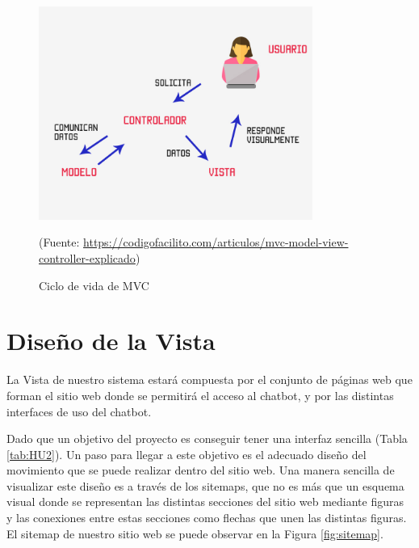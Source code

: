 \begin{figure}[h]
\centering
\includegraphics[width=0.8\textwidth]{imagenes/06_Diseno/ciclo_vida_MVC.jpg}
\begin{center}
(Fuente: \url{https://codigofacilito.com/articulos/mvc-model-view-controller-explicado})
\end{center}
\caption{Ciclo de vida de MVC}
\label{fig:ciclo_vida_MVC}
\end{figure}

\section{Diseño de la Vista} \label{sec:diseño_vista}

La Vista de nuestro sistema estará compuesta por el conjunto de páginas web que forman el sitio web donde se permitirá el acceso al chatbot, y por las distintas interfaces de uso del chatbot.

Dado que un objetivo del proyecto es conseguir tener una interfaz sencilla (Tabla \ref{tab:HU2}). Un paso para llegar a este objetivo es el adecuado diseño del movimiento que se puede realizar dentro del sitio web. Una manera sencilla de visualizar este diseño es a través de los sitemaps, que no es más que un esquema visual donde se representan las distintas secciones del sitio web mediante figuras y las conexiones entre estas secciones como flechas que unen las distintas figuras. El sitemap de nuestro sitio web se puede observar en la Figura \ref{fig:sitemap}.

